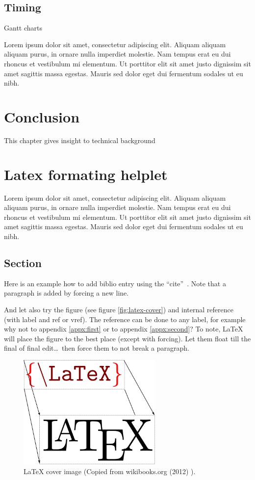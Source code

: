 \documentclass[11pt,a4paper,oneside,article]{memoir}
\begin{document}
\section{Timing}
Gantt charts

Lorem ipsum dolor sit amet, consectetur adipiscing elit. Aliquam aliquam aliquam purus, in ornare nulla imperdiet molestie. Nam tempus erat eu dui rhoncus et vestibulum mi elementum. Ut porttitor elit sit amet justo dignissim sit amet sagittis massa egestas. Mauris sed dolor eget dui fermentum sodales ut eu nibh. 


\chapter{Conclusion}

This chapter gives insight to technical background

\chapter{Latex formating helplet}
Lorem ipsum dolor sit amet, consectetur adipiscing elit. Aliquam aliquam aliquam purus, in ornare nulla imperdiet molestie. Nam tempus erat eu dui rhoncus et vestibulum mi elementum. Ut porttitor elit sit amet justo dignissim sit amet sagittis massa egestas. Mauris sed dolor eget dui fermentum sodales ut eu nibh. 

\section{Section}
Here is an example how to add biblio entry \cite{kopka:guide} using the \textquotedblleft cite\textquotedblright ~\cite[section 4.2]{tobias:book}. Note that a paragraph is added by forcing a new line.

And let also try the figure (see figure \vref{fig:latex-cover}) and internal reference (with label and ref or vref). The reference can be done to any label, for example why not to appendix \ref{appx:first} or to appendix \ref{appx:second}? To note, \LaTeX{} will place the figure to the best place (except with forcing). Let them float till the final of final edit\ldots ~then force them to not break a paragraph.%
\begin{figure}[h]
  \centering
  \includegraphics[width=7.1cm]{LaTeX_cover}
  \caption{\LaTeX{} cover image (Copied from wikibooks.org (2012) \cite{wikibooks:latex}).}
  \label{fig:latex-cover}
\end{figure}
\end{document}
